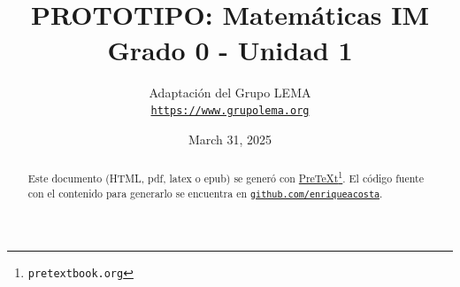 
\title{PROTOTIPO: Matemáticas IM\textsuperscript{\textregistered}\\
{\large Grado 0 - Unidad 1}}
\author{Adaptación del Grupo LEMA\\
\href{https://www.grupolema.org}{\nolinkurl{https://www.grupolema.org}}
}
\date{March 31, 2025}

\raggedbottom
\label{gra0-uni1}\hypertarget{gra0-uni1}{}
\maketitle
\thispagestyle{empty}
\renewcommand*{\abstractname}{}
\begin{abstract}
Este documento (HTML, pdf, latex o epub) se generó con \href{https://pretextbook.org}{PreTeXt}\footnote{\nolinkurl{pretextbook.org}\label{meta-source-2-2}}. El código fuente con el contenido para generarlo se encuentra en \href{https://github.com/enriqueacosta/IllustrativeMath-GrupoLEMA}{\nolinkurl{github.com/enriqueacosta}}.%
\end{abstract}
\clearpage
\renewcommand*{\abstractname}{Licencia}
